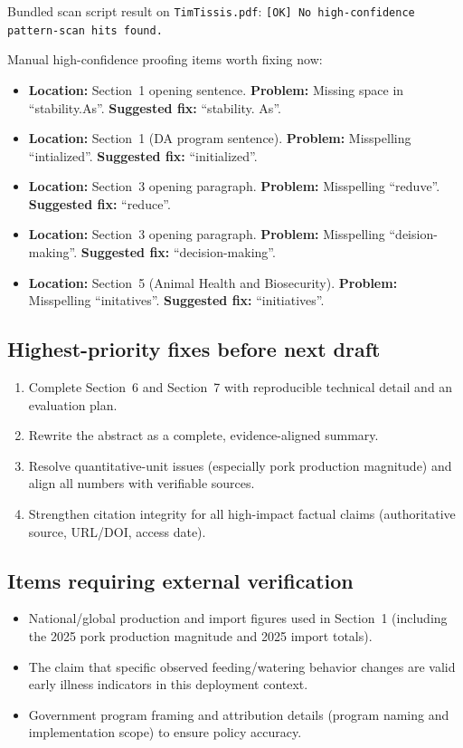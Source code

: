 \documentclass[11pt]{article}
\begin{document}
Bundled scan script result on \texttt{TimTissis.pdf}: \texttt{[OK] No high-confidence pattern-scan hits found.}

Manual high-confidence proofing items worth fixing now:
\begin{itemize}[leftmargin=*]
  \item \textbf{Location:} Section~1 opening sentence. \textbf{Problem:} Missing space in ``stability.As''. \textbf{Suggested fix:} ``stability. As''.
  \item \textbf{Location:} Section~1 (DA program sentence). \textbf{Problem:} Misspelling ``intialized''. \textbf{Suggested fix:} ``initialized''.
  \item \textbf{Location:} Section~3 opening paragraph. \textbf{Problem:} Misspelling ``reduve''. \textbf{Suggested fix:} ``reduce''.
  \item \textbf{Location:} Section~3 opening paragraph. \textbf{Problem:} Misspelling ``deision-making''. \textbf{Suggested fix:} ``decision-making''.
  \item \textbf{Location:} Section~5 (Animal Health and Biosecurity). \textbf{Problem:} Misspelling ``initatives''. \textbf{Suggested fix:} ``initiatives''.
\end{itemize}

\subsection*{Highest-priority fixes before next draft}

\begin{enumerate}[leftmargin=*]
  \item Complete Section~6 and Section~7 with reproducible technical detail and an evaluation plan.
  \item Rewrite the abstract as a complete, evidence-aligned summary.
  \item Resolve quantitative-unit issues (especially pork production magnitude) and align all numbers with verifiable sources.
  \item Strengthen citation integrity for all high-impact factual claims (authoritative source, URL/DOI, access date).
\end{enumerate}

\subsection*{Items requiring external verification}

\begin{itemize}[leftmargin=*]
  \item National/global production and import figures used in Section~1 (including the 2025 pork production magnitude and 2025 import totals).
  \item The claim that specific observed feeding/watering behavior changes are valid early illness indicators in this deployment context.
  \item Government program framing and attribution details (program naming and implementation scope) to ensure policy accuracy.
\end{itemize}
\end{document}
